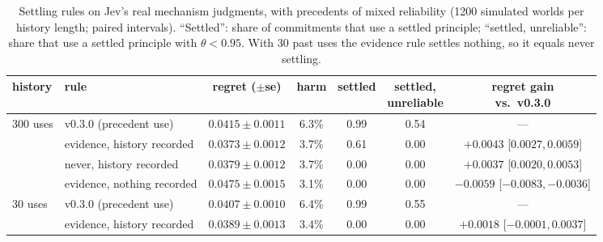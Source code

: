 \documentclass[11pt]{article}
\theoremstyle{definition}
\begin{document}
\begin{table}[h]
\centering\small
\setlength{\tabcolsep}{3pt}
\footnotesize
\begin{tabular}{@{}llccccc@{}}
\toprule
history & rule & regret ($\pm$se) & harm & settled & \makecell{settled,\\unreliable} & \makecell{regret gain\\vs.\ v0.3.0} \\
\midrule
300 uses & v0.3.0 (precedent use) & $0.0415\pm0.0011$ & 6.3\% & 0.99 & 0.54 & --- \\
& evidence, history recorded & $0.0373\pm0.0012$ & 3.7\% & 0.61 & 0.00 & $+0.0043$ [$0.0027,0.0059$] \\
& never, history recorded & $0.0379\pm0.0012$ & 3.7\% & 0.00 & 0.00 & $+0.0037$ [$0.0020,0.0053$] \\
& evidence, nothing recorded & $0.0475\pm0.0015$ & 3.1\% & 0.00 & 0.00 & $-0.0059$ [$-0.0083,-0.0036$] \\
\midrule
30 uses & v0.3.0 (precedent use) & $0.0407\pm0.0010$ & 6.4\% & 0.99 & 0.55 & --- \\
& evidence, history recorded & $0.0389\pm0.0013$ & 3.4\% & 0.00 & 0.00 & $+0.0018$ [$-0.0001,0.0037$] \\
\bottomrule
\end{tabular}
\caption{Settling rules on Jev's real mechanism judgments, with precedents of mixed reliability
(1200 simulated worlds per history length; paired intervals). ``Settled'': share of commitments that
use a settled principle; ``settled, unreliable'': share that use a settled principle with
$\theta<0.95$. With 30 past uses the evidence rule settles nothing, so it equals never settling.}
\label{tab:settle}
\end{table}
\end{document}
